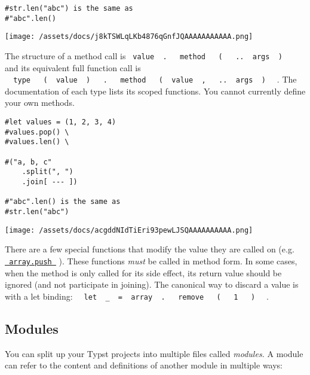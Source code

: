 \begin{verbatim}
#str.len("abc") is the same as
#"abc".len()
\end{verbatim}

\texttt{[image: /assets/docs/j8kTSWLqLKb4876qGnfJQAAAAAAAAAAA.png]}

The structure of a method call is
\texttt{\ value\ }{\texttt{\ .\ }}\texttt{\ }{\texttt{\ method\ }}\texttt{\ }{\texttt{\ (\ }}\texttt{\ }{\texttt{\ ..\ }}\texttt{\ args\ }{\texttt{\ )\ }}\texttt{\ }
and its equivalent full function call is
\texttt{\ }{\texttt{\ type\ }}\texttt{\ }{\texttt{\ (\ }}\texttt{\ value\ }{\texttt{\ )\ }}\texttt{\ }{\texttt{\ .\ }}\texttt{\ }{\texttt{\ method\ }}\texttt{\ }{\texttt{\ (\ }}\texttt{\ value\ }{\texttt{\ ,\ }}\texttt{\ }{\texttt{\ ..\ }}\texttt{\ args\ }{\texttt{\ )\ }}\texttt{\ }
. The documentation of each type lists it\textquotesingle s scoped
functions. You cannot currently define your own methods.

\begin{verbatim}
#let values = (1, 2, 3, 4)
#values.pop() \
#values.len() \

#("a, b, c"
    .split(", ")
    .join[ --- ])

#"abc".len() is the same as
#str.len("abc")
\end{verbatim}

\texttt{[image: /assets/docs/acgddNIdTiEri93pewLJSQAAAAAAAAAA.png]}

There are a few special functions that modify the value they are called
on (e.g.
\href{/docs/reference/foundations/array/\#definitions-push}{\texttt{\ array.push\ }}
). These functions \emph{must} be called in method form. In some cases,
when the method is only called for its side effect, its return value
should be ignored (and not participate in joining). The canonical way to
discard a value is with a let binding:
\texttt{\ }{\texttt{\ let\ }}\texttt{\ \_\ }{\texttt{\ =\ }}\texttt{\ array\ }{\texttt{\ .\ }}\texttt{\ }{\texttt{\ remove\ }}\texttt{\ }{\texttt{\ (\ }}\texttt{\ }{\texttt{\ 1\ }}\texttt{\ }{\texttt{\ )\ }}\texttt{\ }
.

\subsection{Modules}\label{modules}

You can split up your Typst projects into multiple files called
\emph{modules.} A module can refer to the content and definitions of
another module in multiple ways:

